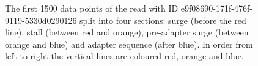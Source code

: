 \begin{figure}
\centering

	\caption[The first 1500 data points of the read with ID e9f08690-171f-476f-9119-5330d0290126 split into four sections: surge, stall, pre-adapter surge and adapter sequence.]{\label{fig:start-sections}The first 1500 data points of the read with ID e9f08690-171f-476f-9119-5330d0290126 split into four sections: surge (before the red line), stall (between red and orange), pre-adapter surge (between orange and blue) and adapter sequence (after blue). In order from left to right the vertical lines are coloured red, orange and blue.}
\end{figure}
